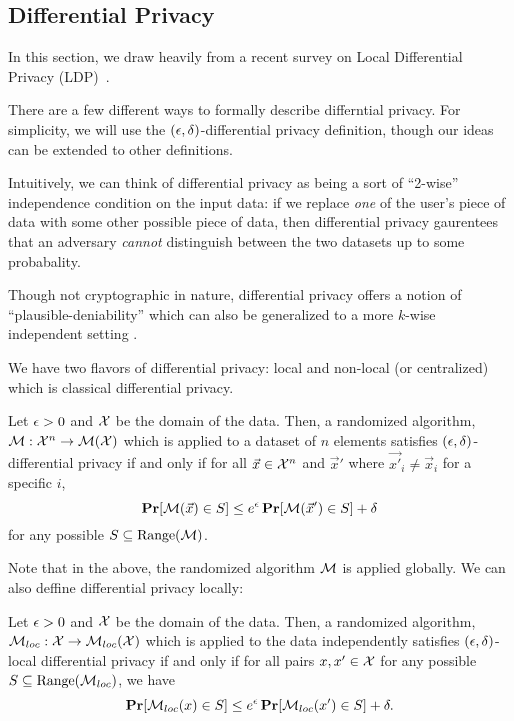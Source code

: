 \documentclass[11pt]{article}
\begin{document}
\subsection{Differential Privacy}
In this section, we draw heavily from a recent survey on Local Differential Privacy (LDP)~\cite{yang2023local}.

There are a few different ways to formally describe differntial privacy.
For simplicity, we will use the $(\epsilon, \delta)$-differential privacy definition, though our ideas can be extended to other definitions.

Intuitively, we can think of differential privacy as being a sort of ``2-wise'' independence condition on the input data: if we replace \emph{one} of the user's piece of data with some other possible piece of data, then differential privacy gaurentees that an adversary \emph{cannot} distinguish between the two datasets up to some probabality.

Though not cryptographic in nature, differential privacy offers a notion of ``plausible-deniability'' which can also be generalized to a more $k$-wise independent setting .

We have two flavors of differential privacy: local and non-local (or centralized) which is classical differential privacy.


\begin{definition}
	Let $\epsilon > 0$ and $\mathcal{X}$ be the domain of the data.
	Then, a randomized algorithm, $\mathcal{M} : \mathcal{X}^n \rightarrow \mathcal{M}(\mathcal{X})$ which is applied to a dataset of $n$ elements satisfies $(\epsilon, \delta)$-differential privacy if and only if for all $\vec{x} \in \mathcal{X}^n$ and $\vec{x}'$ where $\vec{x'}_i \neq \vec{x}_i$ for a specific $i$,
	\[
		\operatorname*{\mathbf{Pr}}[\mathcal{M}(\vec{x}) \in S] \leq e^\epsilon \operatorname*{\mathbf{Pr}}[\mathcal{M}(\vec{x}') \in S] + \delta
	\]
	for any possible $S \subseteq \text{Range}(\mathcal{M})$.
\end{definition}

Note that in the above, the randomized algorithm $\mathcal{M}$ is applied globally.
We can also deffine differential privacy locally:

\begin{definition}
	Let $\epsilon > 0$ and $\mathcal{X}$ be the domain of the data.
	Then, a randomized algorithm, $\mathcal{M}_{loc} : \mathcal{X} \rightarrow \mathcal{M}_{loc}(\mathcal{X})$ which is applied to the data independently satisfies $(\epsilon, \delta)$-local differential privacy if and only if for all pairs $x, x' \in \mathcal{X}$
	for any possible $S \subseteq \text{Range}(\mathcal{M}_{loc})$, we have
	\[
		\operatorname*{\mathbf{Pr}}[\mathcal{M}_{loc}(x) \in S] \leq e^\epsilon \operatorname*{\mathbf{Pr}}[\mathcal{M}_{loc}(x') \in S] + \delta.
	\]
\end{definition}
\end{document}

